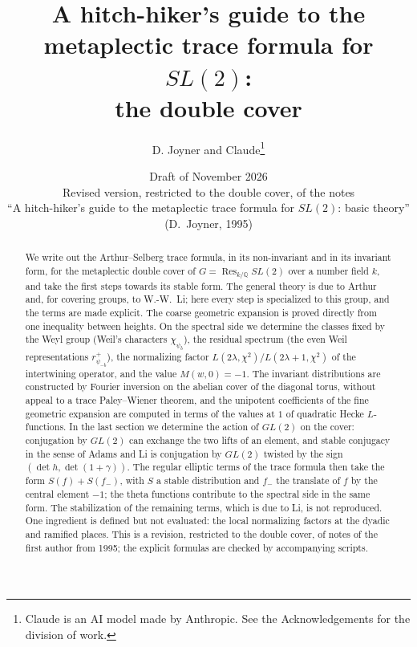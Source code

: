 \documentclass[11pt]{article}
\numberwithin{equation}{section}
\theoremstyle{plain}
\theoremstyle{definition}
\theoremstyle{remark}
\newcommand{\Q}{\mathbb{Q}}
\DeclareMathOperator{\Res}{Res}
\begin{document}
\title{A hitch-hiker's guide to the metaplectic trace formula for $SL(2)$:\\[2pt]
the double cover}
\author{D. Joyner and Claude\thanks{Claude is an AI model made by
Anthropic. See the Acknowledgements for the division of work.}}
\date{Draft of November 2026\\[4pt]
\normalsize Revised version, restricted to the double cover, of the notes\\
\normalsize ``A hitch-hiker's guide to the metaplectic trace formula for
$SL(2)$: basic theory'' (D.~Joyner, 1995)}
\maketitle

\begin{abstract}
We write out the Arthur--Selberg trace formula, in its non-invariant and
in its invariant form, for the metaplectic double cover of
$G=\Res_{k/\Q}SL(2)$ over a number field $k$, and take the first steps
towards its stable form. The general theory is due to
Arthur and, for covering groups, to W.-W.~Li; here every step is
specialized to this group, and the terms are made explicit. The coarse
geometric expansion is proved directly from one inequality between
heights. On the spectral side we determine the classes fixed by the Weyl
group (Weil's characters $\chi_{\psi_b}$), the residual spectrum (the even
Weil representations $r^+_{\psi_{-b}}$), the normalizing factor
$L(2\lambda,\chi^2)/L(2\lambda+1,\chi^2)$ of the intertwining operator,
and the value $M(w,0)=-1$. The invariant distributions are constructed by
Fourier inversion on the abelian cover of the diagonal torus, without
appeal to a trace Paley--Wiener theorem, and the unipotent coefficients
of the fine geometric expansion are computed in terms of the values at
$1$ of quadratic Hecke $L$-functions. In the last section we determine
the action of $GL(2)$ on the cover: conjugation by $GL(2)$ can exchange
the two lifts of an element, and stable conjugacy in the sense of Adams
and Li is conjugation by $GL(2)$ twisted by the sign
$(\det h,\det(1+\gamma))$. The regular elliptic terms of the trace formula
then take the form $S(f)+S(f_-)$, with $S$ a stable distribution and
$f_-$ the translate of $f$ by the central element $-1$; the theta
functions contribute to the spectral side in the same form. The
stabilization of the remaining terms, which is due to Li, is not
reproduced. One ingredient is defined but not evaluated: the local
normalizing factors at the dyadic and ramified places. This is a
revision, restricted to the double cover, of notes of the first author
from 1995; the explicit formulas are checked by accompanying scripts.
\end{abstract}
\end{document}
